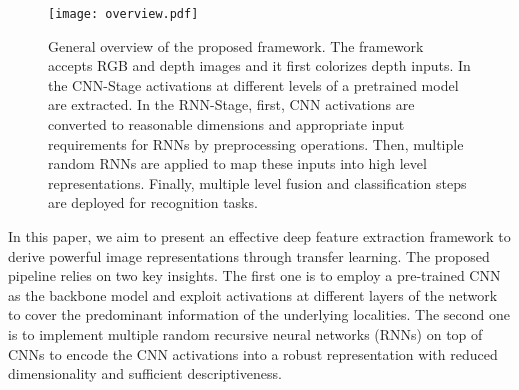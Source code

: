 \documentclass[10pt,journal,compsoc]{IEEEtran}
\begin{document}
\begin{figure*}[!t]
	\centering
	\texttt{[image: overview.pdf]}
	\caption{General overview of the proposed framework. The framework accepts RGB and depth images and it first colorizes depth inputs. In the CNN-Stage activations at different levels of a pretrained model are extracted. In the RNN-Stage, first, CNN activations are converted to reasonable dimensions and appropriate input requirements for RNNs by preprocessing operations. Then, multiple random RNNs are applied to map these inputs into high level representations. Finally, multiple level fusion and classification steps are deployed for recognition tasks.}
	\label{fig:FrameworkStructure}
\end{figure*}

In this paper, we aim to present an effective deep feature extraction framework to derive powerful image representations through transfer learning. The proposed pipeline relies on two key insights. The first one is to employ a pre-trained CNN as the backbone model and exploit activations at different layers of the network to cover the predominant information of the underlying localities. The second one is to implement multiple random recursive neural networks (RNNs) on top of CNNs to encode the CNN activations into a robust representation with reduced dimensionality and sufficient descriptiveness. 
\end{document}
